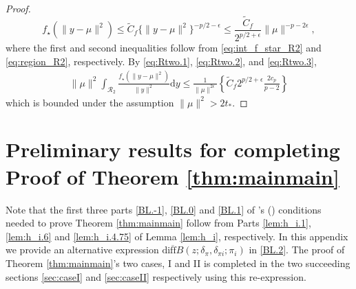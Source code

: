 \documentclass[preprint,11pt]{imsart}
\numberwithin{equation}{section}
\theoremstyle{plain}
\theoremstyle{definition}
\theoremstyle{remark}
\def\citeapos#1{\citeauthor{#1}'s (\citeyear{#1})}
\newcommand{\rd}{\mathrm{d}}
\newcommand{\oldiff}{\overline{\mathrm{diff}B}}
\begin{document}
\begin{proof}
\begin{equation}\label{eq:Rtwo.3}
 f_\star(\|y-\mu\|^2)\leq \tilde{C}_f \{\|y-\mu\|^2\}^{-p/2-\epsilon}
 \leq \frac{\tilde{C}_f}{2^{p/2+\epsilon}}\|\mu\|^{-p-2\epsilon},
\end{equation}
where the first and second inequalities follow from \eqref{eq:int_f_star_R2} and
\eqref{eq:region_R2}, respectively.
By \eqref{eq:Rtwo.1}, \eqref{eq:Rtwo.2}, and \eqref{eq:Rtwo.3},
 \begin{align*}
  \|\mu\|^2 \int_{\mathcal{R}_2}\frac{f_\star(\|y-\mu\|^2)}{\|y\|^2}\rd y 
  \leq \frac{1}{\|\mu\|^{2\epsilon}}
  \left\{\tilde{C}_f 2^{p/2+\epsilon}\frac{2c_p}{p-2} \right\}
 \end{align*}
which is bounded under the assumption $\|\mu\|^2>2t_*$.
\end{proof}



\section{Preliminary results for completing Proof of Theorem \ref{thm:mainmain}}
\label{sec:ap.pre.main}
Note that the first three parts \ref{BL.-1}, \ref{BL.0} and \ref{BL.1}
of \citeapos{Blyth-1951} conditions needed to prove Theorem \ref{thm:mainmain}
follow from 
Parts \ref{lem:h_i.1}, \ref{lem:h_i.6} and \ref{lem:h_i.4.75} of Lemma \ref{lem:h_i},
respectively.
In this appendix we provide an alternative expression $\oldiff(z;\delta_\pi,\delta_{\pi i};\pi_i)$ in \ref{BL.2}.
The proof of Theorem \ref{thm:mainmain}'s two cases, I and II is completed in the
two succeeding sections \ref{sec:caseI} and \ref{sec:caseII} respectively
using this re-expression.
\end{document}
